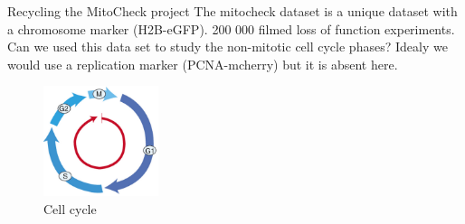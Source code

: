 \documentclass{beamer}
\begin{document}
\begin{frame}{Recycling the MitoCheck project}
The mitocheck dataset is a unique dataset with a chromosome marker (H2B-eGFP). 200 000 filmed loss of function experiments. Can we used this data set to study the non-mitotic cell cycle phases? Idealy we would use a replication marker (PCNA-mcherry) but it is absent here.
\begin{figure}[!ht]
\centering
\includegraphics[width=0.3\textwidth]{Images/somaticcellcycle3.png}
\caption{Cell cycle}
\label{cellcycle}
\end{figure}
\end{frame}
\end{document}
